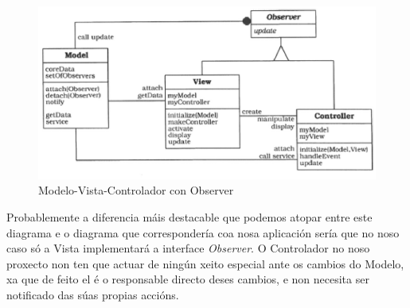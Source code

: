 \begin{figure}
\centering
\includegraphics[width=\textwidth,height=\textheight,keepaspectratio]{figuras/MVC-observer}
\caption{Modelo-Vista-Controlador con Observer}
\label{MVC-observer}
\end{figure}

Probablemente a diferencia máis destacable que podemos atopar entre este diagrama e o diagrama que correspondería coa nosa aplicación sería que no noso caso só a Vista implementará a interface \textit{Observer}. O Controlador no noso proxecto non ten que actuar de ningún xeito especial ante os cambios do Modelo, xa que de feito el é o responsable directo deses cambios, e non necesita ser notificado das súas propias accións.